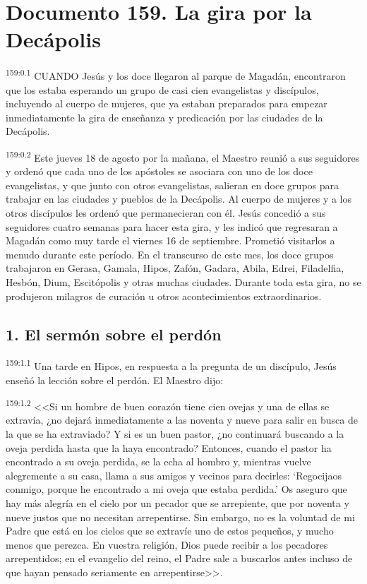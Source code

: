 \chapter{Documento 159. La gira por la Decápolis}
\par 
\textsuperscript{159:0.1} CUANDO Jesús y los doce llegaron al parque de Magadán, encontraron que los estaba esperando un grupo de casi cien evangelistas y discípulos, incluyendo al cuerpo de mujeres, que ya estaban preparados para empezar inmediatamente la gira de enseñanza y predicación por las ciudades de la Decápolis.

\par 
\textsuperscript{159:0.2} Este jueves 18 de agosto por la mañana, el Maestro reunió a sus seguidores y ordenó que cada uno de los apóstoles se asociara con uno de los doce evangelistas, y que junto con otros evangelistas, salieran en doce grupos para trabajar en las ciudades y pueblos de la Decápolis. Al cuerpo de mujeres y a los otros discípulos les ordenó que permanecieran con él. Jesús concedió a sus seguidores cuatro semanas para hacer esta gira, y les indicó que regresaran a Magadán como muy tarde el viernes 16 de septiembre. Prometió visitarlos a menudo durante este período. En el transcurso de este mes, los doce grupos trabajaron en Gerasa, Gamala, Hipos, Zafón, Gadara, Abila, Edrei, Filadelfia, Hesbón, Dium, Escitópolis y otras muchas ciudades. Durante toda esta gira, no se produjeron milagros de curación u otros acontecimientos extraordinarios.

\section*{1. El sermón sobre el perdón}
\par 
\textsuperscript{159:1.1} Una tarde en Hipos, en respuesta a la pregunta de un discípulo, Jesús enseñó la lección sobre el perdón. El Maestro dijo:

\par 
\textsuperscript{159:1.2} <<Si un hombre de buen corazón tiene cien ovejas y una de ellas se extravía, ¿no dejará inmediatamente a las noventa y nueve para salir en busca de la que se ha extraviado? Y si es un buen pastor, ¿no continuará buscando a la oveja perdida hasta que la haya encontrado? Entonces, cuando el pastor ha encontrado a su oveja perdida, se la echa al hombro y, mientras vuelve alegremente a su casa, llama a sus amigos y vecinos para decirles: `Regocijaos conmigo, porque he encontrado a mi oveja que estaba perdida.' Os aseguro que hay más alegría en el cielo por un pecador que se arrepiente, que por noventa y nueve justos que no necesitan arrepentirse. Sin embargo, no es la voluntad de mi Padre que está en los cielos que se extravíe uno de estos pequeños, y mucho menos que perezca. En vuestra religión, Dios puede recibir a los pecadores arrepentidos; en el evangelio del reino, el Padre sale a buscarlos antes incluso de que hayan pensado seriamente en arrepentirse>>.


